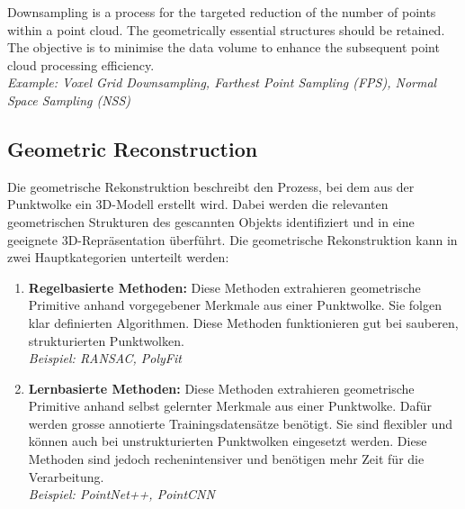 \begin{English}
    Downsampling is a process for the targeted reduction of the number of points within a point cloud. The geometrically essential structures should be retained. The objective is to minimise the data volume to enhance the subsequent point cloud processing efficiency. \cite{liu3DPointCloud2021}\\
    \textit{Example: Voxel Grid Downsampling, Farthest Point Sampling (FPS), Normal Space Sampling (NSS)}
\end{English}
  

\subsection{Geometric Reconstruction}
\begin{German}
    Die geometrische Rekonstruktion beschreibt den Prozess, bei dem aus der Punktwolke ein 3D-Modell erstellt wird. Dabei werden die relevanten geometrischen Strukturen des gescannten Objekts identifiziert und in eine geeignete 3D-Repräsentation überführt. Die geometrische Rekonstruktion kann in zwei Hauptkategorien unterteilt werden:

    \begin{enumerate}
        \item \textbf{Regelbasierte Methoden:} Diese Methoden extrahieren geometrische Primitive anhand vorgegebener Merkmale aus einer Punktwolke. Sie folgen klar definierten Algorithmen. Diese Methoden funktionieren gut bei sauberen, strukturierten Punktwolken. \cite{fangScantoBIMtoSimAutomatedReconstruction2025}\\
        \textit{Beispiel: RANSAC, PolyFit}

        \item \textbf{Lernbasierte Methoden:} Diese Methoden extrahieren geometrische Primitive anhand selbst gelernter Merkmale aus einer Punktwolke. Dafür werden grosse annotierte Trainingsdatensätze benötigt. Sie sind flexibler und können auch bei unstrukturierten Punktwolken eingesetzt werden. Diese Methoden sind jedoch rechenintensiver und benötigen mehr Zeit für die Verarbeitung. \cite{fangScantoBIMtoSimAutomatedReconstruction2025}\\
        \textit{Beispiel: PointNet++, PointCNN}
    \end{enumerate}
\end{German}


